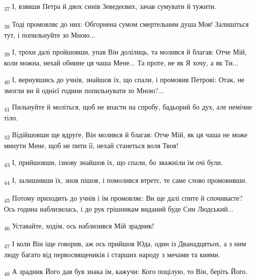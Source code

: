 \begin{tcolorbox}
\textsubscript{37} І, взявши Петра й двох синів Зеведеєвих, зачав сумувати й тужити.
\end{tcolorbox}
\begin{tcolorbox}
\textsubscript{38} Тоді промовляє до них: Обгорнена сумом смертельним душа Моя! Залишіться тут, і попильнуйте зо Мною...
\end{tcolorbox}
\begin{tcolorbox}
\textsubscript{39} І, трохи далі пройшовши, упав Він долілиць, та молився й благав: Отче Мій, коли можна, нехай обмине ця чаша Мене... Та проте, не як Я хочу, а як Ти...
\end{tcolorbox}
\begin{tcolorbox}
\textsubscript{40} І, вернувшись до учнів, знайшов їх, що спали, і промовив Петрові: Отак, не змогли ви й однієї години попильнувати зо Мною?...
\end{tcolorbox}
\begin{tcolorbox}
\textsubscript{41} Пильнуйте й моліться, щоб не впасти на спробу, бадьорий бо дух, але немічне тіло.
\end{tcolorbox}
\begin{tcolorbox}
\textsubscript{42} Відійшовши ще вдруге, Він молився й благав: Отче Мій, як ця чаша не може минути Мене, щоб не пити її, нехай станеться воля Твоя!
\end{tcolorbox}
\begin{tcolorbox}
\textsubscript{43} І, прийшовши, ізнову знайшов їх, що спали, бо зважніли їм очі були.
\end{tcolorbox}
\begin{tcolorbox}
\textsubscript{44} І, залишивши їх, знов пішов, і помолився втретє, те саме слово промовивши.
\end{tcolorbox}
\begin{tcolorbox}
\textsubscript{45} Потому приходить до учнів і їм промовляє: Ви ще далі спите й спочиваєте? Ось година наблизилась, і до рук грішникам виданий буде Син Людський...
\end{tcolorbox}
\begin{tcolorbox}
\textsubscript{46} Уставайте, ходім, ось наблизився Мій зрадник!
\end{tcolorbox}
\begin{tcolorbox}
\textsubscript{47} І коли Він іще говорив, аж ось прийшов Юда, один із Дванадцятьох, а з ним люду багато від первосвящеників і старших народу з мечами та киями.
\end{tcolorbox}
\begin{tcolorbox}
\textsubscript{48} А зрадник Його дав був знака їм, кажучи: Кого поцілую, то Він, беріть Його.
\end{tcolorbox}
